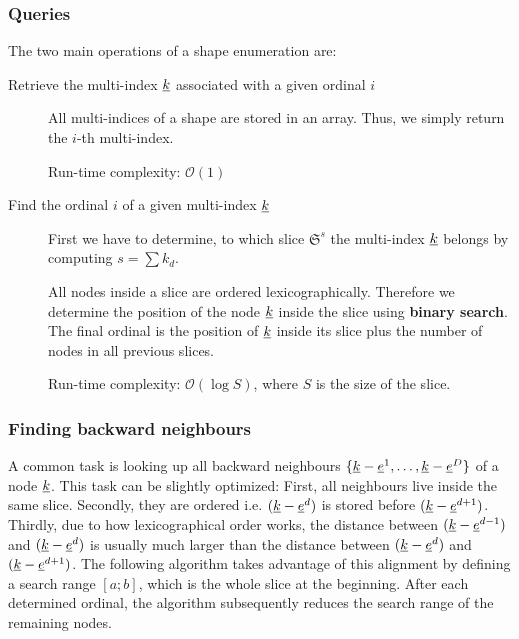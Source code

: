 \documentclass{article}
\begin{document}
\subsubsection{Queries}
The two main operations of a shape enumeration are:
\begin{description}
\item[Retrieve the multi-index \(\underline{k}\) associated with a given ordinal \(i\)]\mbox{}
  \par
  All multi-indices of a shape are stored in an array.
  Thus, we simply return the \(i\)-th multi-index.
  \par
  Run-time complexity: \(\mathcal{O}(1)\)
\item[Find the ordinal \(i\) of a given multi-index \(\underline{k}\)]\mbox{}
  \par
  First we have to determine, to which slice \(\mathfrak{S}^s\) the multi-index \(\underline{k}\) belongs by
  computing \(s = \sum k_d \).\par
  All nodes inside a slice are ordered lexicographically. Therefore
  we determine the position of the node \(\underline{k}\) inside the slice using \textbf{binary search}.
  The final ordinal is the position of \(\underline{k}\) inside its slice plus
  the number of nodes in all previous slices.
  \par
  Run-time complexity: \(\mathcal{O}(\log{}S)\), where \(S\) is the size of the slice.

\end{description}

\subsubsection{Finding backward neighbours}
A common task is looking up all backward neighbours \(\{\underline{k}-\underline{e}^1,\ldots,\underline{k}-\underline{e}^D\}\)
of a node \(\underline{k}\). This task can be slightly optimized: First, all neighbours live inside the same slice.
Secondly, they are ordered i.e. \((\underline{k}-\underline{e}^d)\) is stored before \((\underline{k}-\underline{e}^{d+1})\).
Thirdly, due to how lexicographical order works, the distance between \((\underline{k}-\underline{e}^{d-1})\) and \((\underline{k}-\underline{e}^d)\)
is usually much larger than the distance between \((\underline{k}-\underline{e}^d)\) and \((\underline{k}-\underline{e}^{d+1})\).
The following algorithm takes advantage of this alignment by defining a search range \([a;b]\),
which is the whole slice at the beginning.
After each determined ordinal, the algorithm subsequently reduces the search range
of the remaining nodes.
\end{document}
